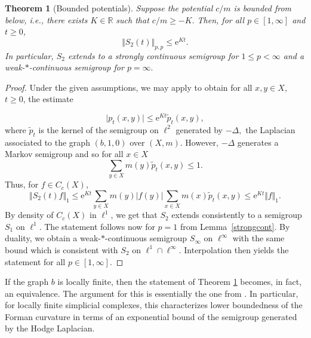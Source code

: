 \documentclass[10pt]{amsart}
\newtheorem{theorem}{Theorem}[section]
\theoremstyle{definition}
\begin{document}
\begin{theorem}[Bounded potentials]\label{boundedpotential}
    Suppose the potential $c\slash m$ is bounded from below, i.e., there exists $K\in\mathbb{R}$ such that $c\slash m\geq -K.$ Then, for all $p\in[1,\infty]$ and $t\ge 0$,
        \[\Vert S_2(t)   \Vert_{p,p}\leq \mathrm{e}^{Kt} .\]
In particular, $S_2$ extends to a strongly continuous semigroup for $1\le p<\infty$ and a weak-$\ast$-continuous semigroup for $p=\infty.$
\end{theorem}
\begin{proof}
    Under the given assumptions, we may apply \cite[Theorem~5.2 (a)]{GKS} to obtain for all $x,y\in X$,    $t\geq 0$, the estimate 

    \[\vert p_t(x,y)\vert\leq \mathrm{e}^{Kt}\tilde p_t(x,y),\]
    where $\tilde p_t$ is the kernel of the semigroup on $\ell^2$ generated by $-\Delta,$ the Laplacian associated to the graph $(b,1,0)$ over $(X,m)$. However, $- \Delta$ generates a Markov semigroup \cite[Proposition~2.6]{KLW} and so for all $x\in X$
    \[\sum_{y\in X} m(y)\tilde p_t(x,y)\leq 1.\] Thus, for $ f\in C_c(X)$,
    \[\Vert S_2(t) f\Vert_1\leq\mathrm{e}^{Kt}\sum_{y\in X} m(y)\vert f(y)\vert\sum_{x\in X} m(x)\tilde p_t(x,y)\leq \mathrm{e}^{Kt}\Vert f\Vert_1.\] By density of $C_c(X)$ in $\ell^1$, we get that $S_2$ extends consistently to a semigroup $S_1$ on $\ell^1.$ 
The statement follows now for $p = 1$ from Lemma~\ref{strongcont}. By duality, we obtain a weak-$\ast$-continuous semigroup $S_\infty$ on $\ell^\infty$ with the same bound which is consistent with $S_2$ on $\ell^1\cap \ell^\infty$. Interpolation then yields the statement for all $p\in[1,\infty].$
\end{proof}

If the graph $b$ is locally finite, then the statement of Theorem \ref{boundedpotential} becomes, in fact, an equivalence. The argument for this is essentially the one from \cite[Theorem~2.1]{JM}. In particular, for locally finite simplicial complexes, this characterizes lower boundedness of the Forman curvature in terms of an exponential bound of the semigroup generated by the Hodge Laplacian.
\end{document}
